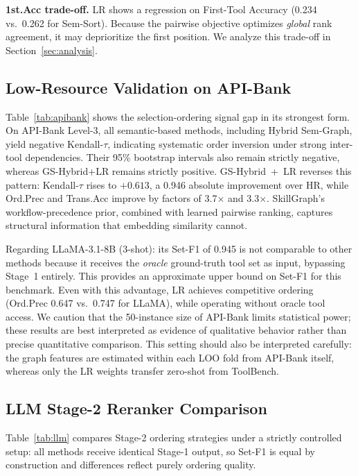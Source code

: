\documentclass[lettersize,journal]{IEEEtran}
\begin{document}
\textbf{1st.Acc trade-off.}
LR shows a regression on First-Tool Accuracy (0.234 vs.\ 0.262 for Sem-Sort).
Because the pairwise objective optimizes \emph{global} rank agreement, it may deprioritize the first position.
We analyze this trade-off in Section~\ref{sec:analysis}.

\subsection{Low-Resource Validation on API-Bank}



Table~\ref{tab:apibank} shows the selection-ordering signal gap in its strongest form.
On API-Bank Level-3, all semantic-based methods, including Hybrid Sem-Graph, yield negative Kendall-$\tau$, indicating systematic order inversion under strong inter-tool dependencies. Their 95\% bootstrap intervals also remain strictly negative, whereas GS-Hybrid+LR remains strictly positive.
GS-Hybrid~+~LR reverses this pattern: Kendall-$\tau$ rises to $+0.613$, a 0.946 absolute improvement over HR, while Ord.Prec and Trans.Acc improve by factors of 3.7$\times$ and 3.3$\times$.
SkillGraph's workflow-precedence prior, combined with learned pairwise ranking, captures structural information that embedding similarity cannot.

Regarding LLaMA-3.1-8B (3-shot): its Set-F1 of 0.945 is not comparable to other methods because it receives the \emph{oracle} ground-truth tool set as input, bypassing Stage~1 entirely.
This provides an approximate upper bound on Set-F1 for this benchmark.
Even with this advantage, LR achieves competitive ordering (Ord.Prec 0.647 vs.\ 0.747 for LLaMA), while operating without oracle tool access.
We caution that the 50-instance size of API-Bank limits statistical power; these results are best interpreted as evidence of qualitative behavior rather than precise quantitative comparison.
This setting should also be interpreted carefully: the graph features are estimated within each LOO fold from API-Bank itself, whereas only the LR weights transfer zero-shot from ToolBench.

\subsection{LLM Stage-2 Reranker Comparison}



Table~\ref{tab:llm} compares Stage-2 ordering strategies under a strictly controlled setup: all methods receive identical Stage-1 output, so Set-F1 is equal by construction and differences reflect purely ordering quality.
\end{document}
